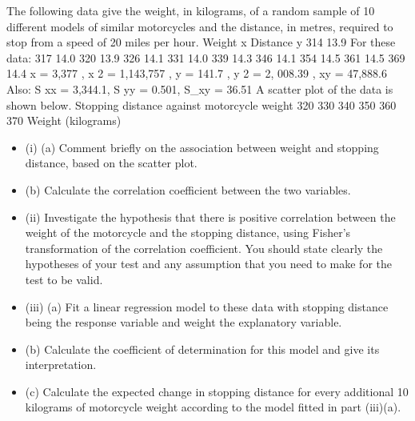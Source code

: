 \documentclass[a4paper,12pt]{article}
\begin{document}
\newpage
The following data give the weight, in kilograms, of a random sample of 10 different
models of similar motorcycles and the distance, in metres, required to stop from a
speed of 20 miles per hour.
Weight x
Distance y
314
13.9
For these data:
317
14.0
320
13.9
326
14.1
331
14.0
339
14.3
346
14.1
354
14.5
361
14.5
369
14.4
\sum x = 3,377 , \sum x 2 = 1,143,757 , \sum y = 141.7 ,
\sum y 2 = 2, 008.39 , \sum xy = 47,888.6
Also: S xx = 3,344.1, S yy = 0.501, S_{xy} = 36.51
A scatter plot of the data is shown below.
Stopping distance against motorcycle weight
320
330
340
350
360
370
Weight (kilograms)
\begin{itemize}
\item (i)
(a) Comment briefly on the association between weight and stopping distance, based on the scatter plot.
\item (b) Calculate the correlation coefficient between the two variables.
\item 
(ii) Investigate the hypothesis that there is positive correlation between the weight of the motorcycle and the stopping distance, using Fisher’s transformation of the correlation coefficient. You should state clearly the hypotheses of your
test and any assumption that you need to make for the test to be valid.
\item 
(iii) (a)
Fit a linear regression model to these data with stopping distance being the response variable and weight the explanatory variable.

\item (b)
Calculate the coefficient of determination for this model and give its interpretation.
\item (c)
Calculate the expected change in stopping distance for every additional 10 kilograms of motorcycle weight according to the model fitted in
part (iii)(a).
\end{itemize}
\end{document}
